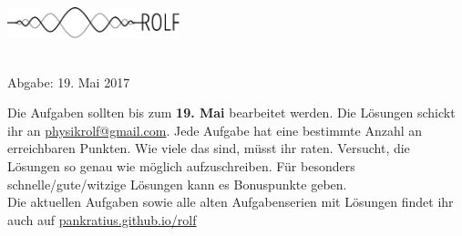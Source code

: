 \documentclass[a4paper]{article}
\begin{document}
	
\vspace*{-1cm}
\parbox{4cm}{\vspace{-0.2cm}\includegraphics[width=5cm]{../images/logo_scaled.pdf}}
\parbox{10.6cm}{ \\
			Abgabe: 19. Mai 2017 \\ 
			\vspace*{-.5cm} }
		\vspace{0.5cm}
	

\thispagestyle{empty}
\begin{framed}
	\noindent
	\scriptsize
	Die Aufgaben sollten bis zum \textbf{19. Mai} bearbeitet werden. Die Lösungen schickt ihr an \href{mailto:physikrolf@gmail.com}{physikrolf@gmail.com}.
	Jede Aufgabe hat eine bestimmte Anzahl an erreichbaren Punkten. Wie viele das sind, müsst ihr raten. Versucht, die Lösungen so genau wie möglich aufzuschreiben. Für besonders schnelle/gute/witzige Lösungen kann es Bonuspunkte geben.\\ Die aktuellen Aufgaben sowie alle alten Aufgabenserien mit Lösungen findet ihr auch auf \url{pankratius.github.io/rolf}

\end{framed}

\noindent




\end{document}
